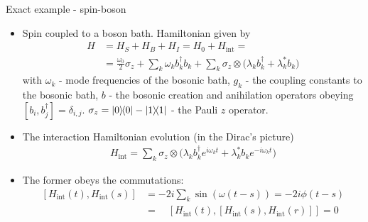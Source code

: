 \documentclass[10pt,xcolor={table,dvipsnames},t]{beamer}
\newcommand{\Hint}{H_{\text{int}}}
\newcommand{\outerprod}[2]{\ket{#1}\!\!\bra{#2}}
\begin{document}
\begin{frame}{Exact example - spin-boson}
  \begin{itemize}
    \item<1-> Spin coupled to a boson bath. Hamiltonian given by 
      \begin{equation}
        \begin{split}
          H &= H_S + H_B + H_I = H_0 + \Hint = \\
            &= \frac{\omega_0}{2}\sigma_z + \sum_k \omega_k b_k^\dag b_k + \sum_k \sigma_z \otimes \bigl(\lambda_k b_k^\dag + \lambda_k^* b_k)
        \end{split}
      \end{equation}
      with $\omega_k$ - mode frequencies of the bosonic bath, $g_k$ - the coupling constants to the bosonic bath, 
      $b$ - the bosonic creation and anihilation operators obeying 
      $[b_i,b_j^\dag] = \delta_{i,j}$.
      $\sigma_z = \outerprod{0}{0} - \outerprod{1}{1}$ - the Pauli $z$ operator.
    \item<2-> The interaction Hamiltonian evolution (in the Dirac's picture)
      \begin{equation}
        \begin{split}
          \Hint = \sum_k \sigma_z \otimes \bigl( \lambda_k b_k^\dag e^{i\omega_k t} + \lambda_k^* b_k e^{-i\omega_k t} \bigr)
        \end{split}
      \end{equation}
      \item<3-> The former obeys the commutations:
        \begin{equation}
          \begin{split}
            [\Hint(t), \Hint(s)] &= -2i\sum_k \sin(\omega(t-s)) = -2i\phi(t-s) \\ 
            &= \quad [\Hint(t),[\Hint(s),\Hint(r)]] = 0
          \end{split}
        \end{equation}
  \end{itemize}
\end{frame}
\end{document}
